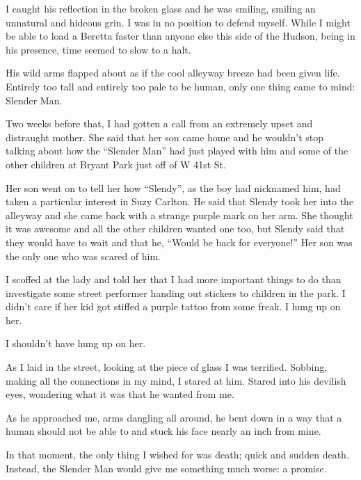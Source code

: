 I caught his reflection in the broken glass and he was smiling,
smiling an unnatural and hideous grin. I was in no position to
defend myself. While I might be able to load a Beretta faster than
anyone else this side of the Hudson, being in his presence, time
seemed to slow to a halt.



His wild arms flapped about as if the cool alleyway breeze had been
given life. Entirely too tall and entirely too pale to be human,
only one thing came to mind: Slender Man.



Two weeks before that, I had gotten a call from an extremely upset
and distraught mother. She said that her son came home and he
wouldn't stop talking about how the ``Slender Man''
had just played with him and some of the other children at Bryant
Park just off of W 41st St.



Her son went on to tell her how ``Slendy'', as the boy
had nicknamed him, had taken a particular interest in Suzy Carlton.
He said that Slendy took her into the alleyway and she came back
with a strange purple mark on her arm. She thought it was awesome
and all the other children wanted one too, but Slendy said that
they would have to wait and that he, ``Would be back for
everyone!'' Her son was the only one who was scared of
him.



I scoffed at the lady and told her that I had more important things
to do than investigate some street performer handing out stickers
to children in the park. I didn't care if her kid got stiffed
a purple tattoo from some freak. I hung up on her.



I shouldn't have hung up on her.



As I laid in the street, looking at the piece of glass I was
terrified. Sobbing, making all the connections in my mind, I stared
at him. Stared into his devilish eyes, wondering what it was that
he wanted from me.



As he approached me, arms dangling all around, he bent down in a
way that a human should not be able to and stuck his face nearly an
inch from mine.



In that moment, the only thing I wished for was death; quick and
sudden death. Instead, the Slender Man would give me something much
worse: a promise.




